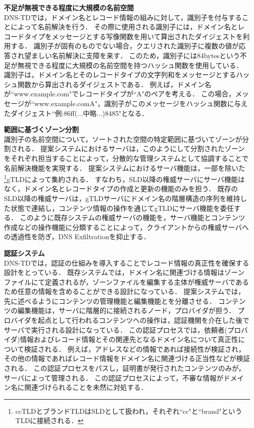 \hspace{-12pt}\textbf{不足が無視できる程度に大規模の名前空間}\\
\hspace{12pt}DNS-TDでは，ドメイン名とレコード情報の組みに対して，識別子を付与することによって名前解決を行う．
その際に使用される識別子には，ドメイン名とレコードタイプをメッセージとする写像関数を用いて算出されたダイジェストを利用する．
識別子が固有のものでない場合，クエリされた識別子に複数の値が応答され望ましい名前解決に支障を来す．
このため，識別子には84bytesという不足が無視できる程度に大規模の名前空間を持つハッシュ関数を使用している．
識別子は，ドメイン名とそのレコードタイプの文字列和をメッセージとするハッシュ関数から算出されるダイジェストである．
例えば，ドメイン名が``www.example.com"でレコードタイプが``A"のペアを考える．
この場合，メッセージが``www.example.comA"，識別子がこのメッセージをハッシュ関数に与えたダイジェスト``例:86ff(...中略...)8485"となる．\newline

\hspace{-12pt}\textbf{範囲に基づくゾーン分割}\\
\hspace{12pt}識別子の名前空間について，ソートされた空間の特定範囲に基づいてゾーンが分割される．
提案システムにおけるサーバは，このようにして分割されたゾーンをそれぞれ担当することによって，分散的な管理システムとして協調することで名前解決機能を実現する．
提案システムにおけるサーバ機能は，一部を除いた\footnote{ccTLDとブランドTLDはSLDとして扱われ，それぞれ``cc"と``brand"というTLDに接続される．}gTLDによって集約される．
すなわち，SLD以降の権威サーバにサーバ機能はなく，ドメイン名とレコードタイプの作成と更新の機能のみを担う．
既存のSLD以降の権威サーバは，gTLDサーバにドメイン名の階層構造の序列を維持した状態で連結し，コンテンツ情報の操作を通じてgTLDにサーバ機能を委任する．
このように既存システムの権威サーバの機能を，サーバ機能とコンテンツ作成などの操作機能に分類することによって，クライアントからの権威サーバへの透過性を防ぎ，DNS Exfiltrationを抑止する．\newline

\hspace{-12pt}\textbf{認証システム}\\
\hspace{12pt}DNS-TDでは，認証の仕組みを導入することでレコード情報の真正性を確保する設計をとっている．
既存システムでは，ドメイン名に関連づける情報はゾーンファイルにて定義されるが，ゾーンファイルを編集する主体が権威サーバであるため任意の情報を含めることができる設計になっている．
提案システムでは，先に述べるようにコンテンツの管理機能と編集機能とを分離させる．
コンテンツの編集機能は，サーバに階層的に接続されるノード，プロバイダが担う．
プロバイダを起点として行われるコンテンツへの操作は，認証機関を介在した後でサーバで実行される設計になっている．
この認証プロセスでは，依頼者(プロバイダ)情報およびレコード情報とその関連先となるドメイン名について真正性について検証される．
例えば，アドレスなどの情報であれば接続性が検証され，その他の情報であればレコード情報をドメイン名に関連づける正当性などが検証される．
この認証プロセスをパスし，証明書が発行されたコンテンツのみが，サーバによって管理される．
この認証プロセスによって，不審な情報がドメイン名に関連づけられることを未然に対処する．

